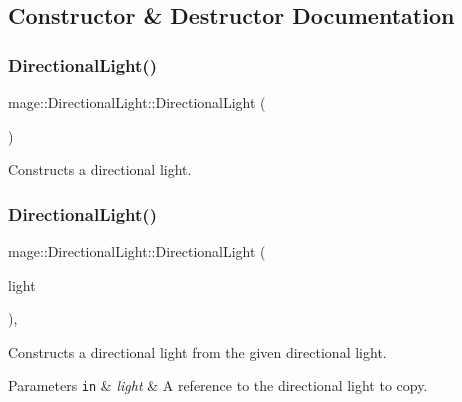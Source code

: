 \subsection{Constructor \& Destructor Documentation}
\hypertarget{classmage_1_1_directional_light_a688b26cb1d12d55258ae34bbac498465}{}\label{classmage_1_1_directional_light_a688b26cb1d12d55258ae34bbac498465} 
\subsubsection{\texorpdfstring{Directional\+Light()}{DirectionalLight()}\hspace{0.1cm}{\footnotesize\ttfamily [1/3]}}
{\footnotesize\ttfamily mage\+::\+Directional\+Light\+::\+Directional\+Light (\begin{DoxyParamCaption}{ }\end{DoxyParamCaption})\hspace{0.3cm}{\ttfamily [noexcept]}}

Constructs a directional light. \hypertarget{classmage_1_1_directional_light_a0a89074b94178d9c3d7914d85ca5fdaa}{}\label{classmage_1_1_directional_light_a0a89074b94178d9c3d7914d85ca5fdaa} 
\subsubsection{\texorpdfstring{Directional\+Light()}{DirectionalLight()}\hspace{0.1cm}{\footnotesize\ttfamily [2/3]}}
{\footnotesize\ttfamily mage\+::\+Directional\+Light\+::\+Directional\+Light (\begin{DoxyParamCaption}\item[{const \hyperlink{classmage_1_1_directional_light}{Directional\+Light} \&}]{light }\end{DoxyParamCaption})\hspace{0.3cm}{\ttfamily [default]}, {\ttfamily [noexcept]}}

Constructs a directional light from the given directional light.


\begin{DoxyParams}[1]{Parameters}
\mbox{\tt in}  & {\em light} & A reference to the directional light to copy. \\
\hline
\end{DoxyParams}
\hypertarget{classmage_1_1_directional_light_af2871e48659e62f8b5278cc0d601a4bc}{}\label{classmage_1_1_directional_light_af2871e48659e62f8b5278cc0d601a4bc} 
